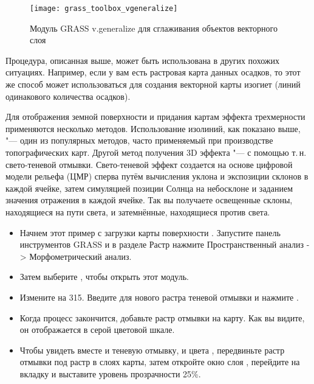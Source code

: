 \begin{figure}[h]
 \centering
 \texttt{[image: grass\_toolbox\_vgeneralize]}
 \caption{Модуль GRASS v.generalize для сглаживания объектов векторного слоя \nixcaption}\label{fig:grass_toolbox_vgeneralize}
\end{figure}

\begin{Tip}\caption{\textsc{Другие применения модуля r.contour}}

Процедура, описанная выше, может быть использована в других похожих
ситуациях. Например, если у вам есть растровая карта данных осадков, то
этот же способ может использоваться для создания векторной карты изогиет
(линий одинакового количества осадков).
\end{Tip}


Для отображения земной поверхности и придания картам эффекта
трехмерности применяются несколько методов. Использование изолиний, как
показано выше, "--- один из популярных методов, часто применяемый при
производстве топографических карт. Другой метод получения 3D эффекта "---
с помощью т.\,н. свето-теневой отмывки. Свето-теневой эффект создается
на основе цифровой модели рельефа (ЦМР) сперва путём вычисления уклона
и экспозиции склонов в каждой ячейке, затем симуляцией позиции Солнца на
небосклоне и заданием значения отражения в каждой ячейке. Так вы
получаете освещенные склоны, находящиеся на пути света, и затемнённые,
находящиеся против света.

\begin{itemize}[label=--]
\item Начнем этот пример с загрузки карты поверхности .
Запустите панель инструментов GRASS и в разделе Растр нажмите
Пространственный анализ -> Морфометрический анализ.
\item Затем выберите , чтобы открыть этот
модуль.
\item Измените  на 315. Введите
 для нового растра теневой отмывки и нажмите
.
\item Когда процесс закончится, добавьте растр отмывки на карту. Как вы
видите, он отображается в серой цветовой шкале.
\item Чтобы увидеть вместе и теневую отмывку, и цвета ,
передвиньте растр отмывки под растр  в слоях карты,
затем откройте окно  слоя ,
перейдите на вкладку  и выставите уровень
прозрачности 25\%.
\end{itemize}

